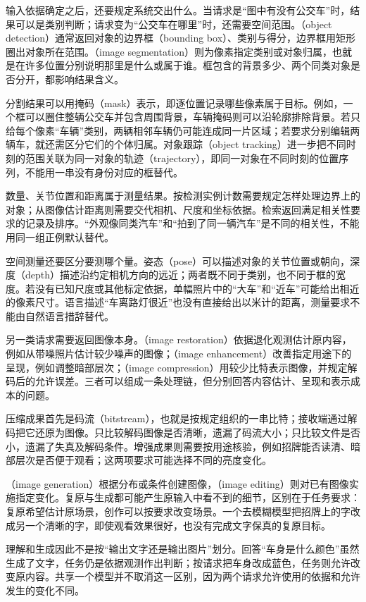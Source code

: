 输入依据确定之后，还要规定系统交出什么。当请求是“图中有没有公交车”时，结果可以是类别判断；请求变为“公交车在哪里”时，还需要空间范围。（object detection）通常返回对象的边界框（bounding box）、类别与得分，边界框用矩形圈出对象所在范围。（image segmentation）则为像素指定类别或对象归属，也就是在许多位置分别说明那里是什么或属于谁。框包含的背景多少、两个同类对象是否分开，都影响结果含义。

分割结果可以用掩码（mask）表示，即逐位置记录哪些像素属于目标。例如，一个框可以圈住整辆公交车并包含周围背景，车辆掩码则可以沿轮廓排除背景。若只给每个像素“车辆”类别，两辆相邻车辆仍可能连成同一片区域；若要求分别编辑两辆车，就还需区分它们的个体归属。对象跟踪（object tracking）进一步把不同时刻的范围关联为同一对象的轨迹（trajectory），即同一对象在不同时刻的位置序列，不能用一串没有身份对应的框替代。

数量、关节位置和距离属于测量结果。按检测实例计数需要规定怎样处理边界上的对象；从图像估计距离则需要交代相机、尺度和坐标依据。检索返回满足相关性要求的记录及排序。“外观像同类汽车”和“拍到了同一辆汽车”是不同的相关性，不能用同一组正例默认替代。

空间测量还要区分要测哪个量。姿态（pose）可以描述对象的关节位置或朝向，深度（depth）描述沿约定相机方向的远近；两者既不同于类别，也不同于框的宽度。若没有已知尺度或其他标定依据，单幅照片中的“大车”和“近车”可能给出相近的像素尺寸。语言描述“车离路灯很近”也没有直接给出以米计的距离，测量要求不能由自然语言措辞替代。

另一类请求需要返回图像本身。（image restoration）依据退化观测估计原内容，例如从带噪照片估计较少噪声的图像；（image enhancement）改善指定用途下的呈现，例如调整暗部层次；（image compression）用较少比特表示图像，并规定解码后的允许误差。三者可以组成一条处理链，但分别回答内容估计、呈现和表示成本的问题。

压缩成果首先是码流（bitstream），也就是按规定组织的一串比特；接收端通过解码把它还原为图像。只比较解码图像是否清晰，遗漏了码流大小；只比较文件是否小，遗漏了失真及解码条件。增强成果则需要按用途核验，例如招牌能否读清、暗部层次是否便于观看；这两项要求可能选择不同的亮度变化。

（image generation）根据分布或条件创建图像，（image editing）则对已有图像实施指定变化。复原与生成都可能产生原输入中看不到的细节，区别在于任务要求：复原希望估计原场景，创作可以按要求改变场景。一个去模糊模型把招牌上的字改成另一个清晰的字，即使观看效果很好，也没有完成文字保真的复原目标。

理解和生成因此不是按“输出文字还是输出图片”划分。回答“车身是什么颜色”虽然生成了文字，任务仍是依据观测作出判断；按请求把车身改成蓝色，任务则允许改变原内容。共享一个模型并不取消这一区别，因为两个请求允许使用的依据和允许发生的变化不同。

